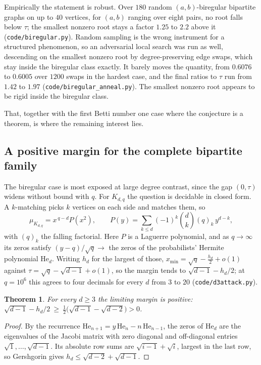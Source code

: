 \documentclass[11pt]{article}
\newtheorem{theorem}{Theorem}
\theoremstyle{remark}
\begin{document}
Empirically the statement is robust. Over $180$ random $(a,b)$-biregular bipartite graphs on
up to $40$ vertices, for $(a,b)$ ranging over eight pairs, no root falls below $\tau$; the
smallest nonzero root stays a factor $1.25$ to $2.2$ above it
(\texttt{code/biregular.py}). Random sampling is the wrong instrument for a structured
phenomenon, so an adversarial local search was run as well, descending on the smallest nonzero
root by degree-preserving edge swaps, which stay inside the biregular class exactly. It barely
moves the quantity, from $0.6076$ to $0.6005$ over $1200$ swaps in the hardest case, and the
final ratios to $\tau$ run from $1.42$ to $1.97$ (\texttt{code/biregular\_anneal.py}). The
smallest nonzero root appears to be rigid inside the biregular class.

That, together with the first Betti number one case where the conjecture is a theorem, is
where the remaining interest lies.

\subsection{A positive margin for the complete bipartite family}\label{sec:margin}

The biregular case is most exposed at large degree contrast, since the gap $(0,\tau)$ widens
without bound with $q$. For $K_{d,q}$ the question is decidable in closed form. A $k$-matching
picks $k$ vertices on each side and matches them, so
\begin{equation}\label{eq:kdq}
   \mu_{K_{d,q}}=x^{\,q-d}P(x^2),\qquad
   P(y)=\sum_{k\le d}(-1)^k\binom{d}{k}(q)_k\,y^{d-k},
\end{equation}
with $(q)_k$ the falling factorial. Here $P$ is a Laguerre polynomial, and as $q\to\infty$ its
zeros satisfy $(y-q)/\sqrt q\to$ the zeros of the probabilists' Hermite polynomial
$\mathrm{He}_d$. Writing $h_d$ for the largest of those,
$x_{\min}=\sqrt q-\tfrac{h_d}{2}+o(1)$ against $\tau=\sqrt q-\sqrt{d-1}+o(1)$, so the margin
tends to $\sqrt{d-1}-h_d/2$; at $q=10^6$ this agrees to four decimals for every $d$ from $3$ to
$20$ (\texttt{code/d3attack.py}).

\begin{theorem}\label{thm:margin}
For every $d\ge3$ the limiting margin is positive:
$\sqrt{d-1}-h_d/2\ \ge\ \tfrac12\bigl(\sqrt{d-1}-\sqrt{d-2}\bigr)>0$.
\end{theorem}

\begin{proof}
By the recurrence $\mathrm{He}_{n+1}=y\,\mathrm{He}_n-n\,\mathrm{He}_{n-1}$, the zeros of
$\mathrm{He}_d$ are the eigenvalues of the Jacobi matrix with zero diagonal and off-diagonal
entries $\sqrt1,\dots,\sqrt{d-1}$. Its absolute row sums are $\sqrt{i-1}+\sqrt i$, largest in the
last row, so Gershgorin gives $h_d\le\sqrt{d-2}+\sqrt{d-1}$.
\end{proof}
\end{document}
